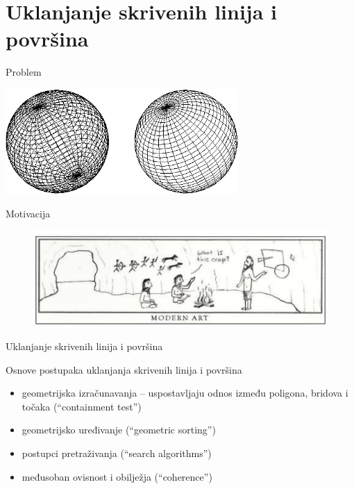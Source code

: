 \documentclass[9pt]{beamer}
\begin{document}
\section{Uklanjanje skrivenih linija i površina}
\begin{frame}{Problem}
	\begin{center}
		\includegraphics[height=4cm]{./slike/meshSpheres.png}
	\end{center}
\end{frame}

\begin{frame}{Motivacija}
	\begin{figure}
		\centering
		\includegraphics[width=0.8\linewidth]{./slike/modern_art}
	\end{figure}
	
\end{frame}
\begin{frame}{Uklanjanje skrivenih linija i površina}
	\begin{block}{Osnove postupaka uklanjanja skrivenih linija i površina}
		\begin{itemize}
			\item geometrijska izračunavanja – uspostavljaju odnos između poligona, bridova i točaka (“containment test”)
			\item geometrijsko uređivanje (“geometric sorting”)
			\item postupci pretraživanja (“search algorithms”)
			\item međusoban ovisnost i obilježja (“coherence”)
		\end{itemize}
	\end{block}
\end{frame}
\end{document}
